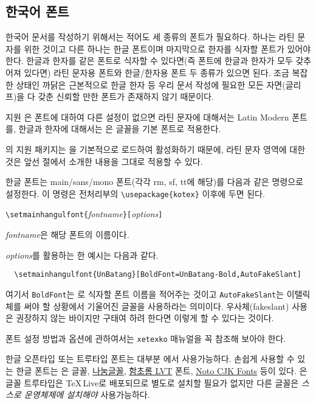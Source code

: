 \subsection{한국어 폰트}
\label{kofonts}

%
한국어 문서를 작성하기 위해서는 적어도 세 종류의 폰트가 필요하다. 하나는 라틴 문자를 위한 것이고 다른 하나는 한글 폰트이며 마지막으로 한자를 식자할 폰트가 있어야 한다. 
한글과 한자를 같은 폰트로 식자할 수 있다면(즉 폰트에 한글과 한자가 모두 갖추어져 있다면) 라틴 문자용 폰트와 한글/한자용 폰트 두 종류가 있으면 된다. 조금 복잡한 상태인 까닭은 근본적으로 한글 한자 등 우리 문서 작성에 필요한 모든 자면(글리프)을 다 갖춘 신뢰할 만한 폰트가 존재하지 않기 때문이다.

\XeLaTeX{} 지원 \koTeX 은 폰트에 대하여 다른 설정이 없으면 라틴 문자에 대해서는 Latin Modern 폰트를, 한글과 한자에 대해서는 은 글꼴을 기본 폰트로 적용한다.

\koTeX 의 \XeLaTeX{} 지원 패키지는 을 기본적으로 로드하여 활성화하기 때문에, 라틴 문자 영역에 대한 것은 앞선 절에서 소개한 내용을 그대로 적용할 수 있다. 

한글 폰트는 main/sans/mono 폰트(각각 rm, sf, tt에 해당)를 다음과 같은 명령으로 설정한다. 이 명령은 전처리부의 \verb|\usepackage{kotex}| 이후에 두면 된다.
\begin{lscommand}
\verb|\setmainhangulfont{|\emph{fontname}\verb|}[|\emph{options}\verb|]|
\end{lscommand}
\noindent \emph{fontname}은 해당 폰트의 이름이다. 

\emph{options}를 활용하는 한 예시는 다음과 같다.
\begin{verbatim}
  \setmainhangulfont{UnBatang}[BoldFont=UnBatang-Bold,AutoFakeSlant]
\end{verbatim}
여기서 \verb|BoldFont|는 로 식자할 폰트 이름을 적어주는 것이고%
\verb|AutoFakeSlant|\allowbreak 는 이탤릭체를 써야 할 상황에서 기울어진 글꼴을 사용하라는 의미이다. 우사체(fakeslant)
사용은 권장하지 않는 바이지만 구태여 하려 한다면 이렇게 할 수 있다는 것이다.

폰트 설정 방법과 옵션에 관하여서는 \texttt{xetexko} 매뉴얼\cite{xetexko}을 꼭 참조해 보아야 한다.

한글 오픈타입 또는 트루타입 폰트는 대부분 \XeLaTeX 에서 사용가능하다.
손쉽게 사용할 수 있는 한글 폰트는 은 글꼴, 
\href{https://hangeul.naver.com}{나눔글꼴}, 
\href{http://wiki.ktug.org/wiki/wiki.php/%ED%95%A8%EC%B4%88%EB%A1%AC%EC%B2%B4LVT}{함초롬 LVT} 폰트,
\href{https://www.google.com/get/noto/}{Noto CJK Fonts} 등이 있다.
은 글꼴 트루타입은 \TeX\,Live로 배포되므로 별도로 설치할 필요가 없지만 다른 글꼴은 \emph{스스로 운영체제에 설치해야} 사용가능하다.

